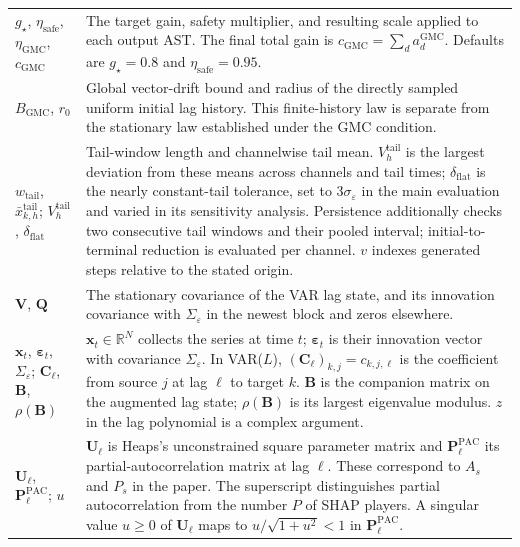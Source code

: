 \begin{longtable}{@{}
>{\raggedright\arraybackslash}p{}
>{\raggedright\arraybackslash}p{}@{}}
$g_\star$, $\eta_{\mathrm{safe}}$,
$\eta_{\mathrm{GMC}}$, $c_{\mathrm{GMC}}$ &
The target gain, safety multiplier, and resulting scale applied to each output
AST. The final total gain is $c_{\mathrm{GMC}}=\sum_d a_d^{\mathrm{GMC}}$.
Defaults are $g_\star=0.8$ and $\eta_{\mathrm{safe}}=0.95$. \\

$B_{\mathrm{GMC}}$, $r_0$ &
Global vector-drift bound and radius of the directly sampled uniform initial
lag history. This finite-history law is separate from the stationary law
established under the GMC condition. \\

$w_{\mathrm{tail}}$, $\bar x^{\mathrm{tail}}_{k,h}$;
$V_h^{\mathrm{tail}}$, $\delta_{\mathrm{flat}}$ &
Tail-window length and channelwise tail mean. $V_h^{\mathrm{tail}}$ is the
largest deviation from these means across channels and tail times;
$\delta_{\mathrm{flat}}$ is the nearly constant-tail tolerance, set to
$3\sigma_\varepsilon$ in the main evaluation and varied in its sensitivity
analysis. Persistence additionally checks two consecutive tail windows and
their pooled interval; initial-to-terminal reduction is evaluated per channel.
$v$ indexes generated steps relative to the stated origin. \\

$\mathbf V$, $\mathbf Q$ &
The stationary covariance of the VAR lag state, and its innovation covariance
with $\Sigma_\varepsilon$ in the newest block and zeros elsewhere. \\

$\mathbf x_t$, $\boldsymbol\varepsilon_t$, $\Sigma_{\varepsilon}$;
$\mathbf C_\ell$, $\mathbf B$, $\rho(\mathbf B)$ &
$\mathbf x_t\in\mathbb R^N$ collects the series at time $t$;
$\boldsymbol\varepsilon_t$ is their innovation vector with covariance
$\Sigma_{\varepsilon}$. In VAR($L$),
$(\mathbf C_\ell)_{k,j}=c_{k,j,\ell}$ is the coefficient from source $j$ at
lag $\ell$ to target $k$. $\mathbf B$ is the companion matrix on the
augmented lag state; $\rho(\mathbf B)$ is its largest eigenvalue modulus.
$z$ in the lag polynomial is a complex argument. \\

$\mathbf U_\ell$, $\mathbf P_\ell^{\mathrm{PAC}}$; $u$ &
$\mathbf U_\ell$ is Heaps's unconstrained square parameter matrix and
$\mathbf P_\ell^{\mathrm{PAC}}$ its partial-autocorrelation matrix at lag
$\ell$. These correspond to $A_s$ and $P_s$ in the paper. The superscript
distinguishes partial autocorrelation from the number $P$ of SHAP players.
A singular value $u\geq0$ of $\mathbf U_\ell$ maps to
$u/\sqrt{1+u^2}<1$ in $\mathbf P_\ell^{\mathrm{PAC}}$. \\


\end{longtable}
